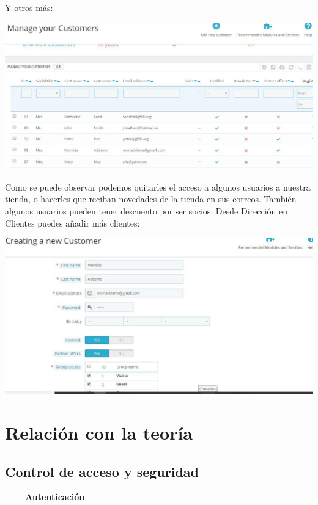 \documentclass{article}
\begin{document}
Y otros más:

\begin{center}
\includegraphics[scale=0.4]{images/order9.jpg}
\end{center}

Como se puede observar podemos quitarles el acceso a algunos usuarios a nuestra tienda, o hacerles que reciban novedades de la tienda en sus correos. También algunos usuarios pueden tener descuento por ser socios. Desde Dirección en Clientes puedes añadir más clientes:

\begin{center}
\includegraphics[scale=0.4]{images/order10.jpg}
\end{center}

\section{Relación con la teoría}

\subsection{Control de acceso y seguridad}

\begin{itemize}
\item[-] \textbf{Autenticación}
\end{itemize}
\end{document}
